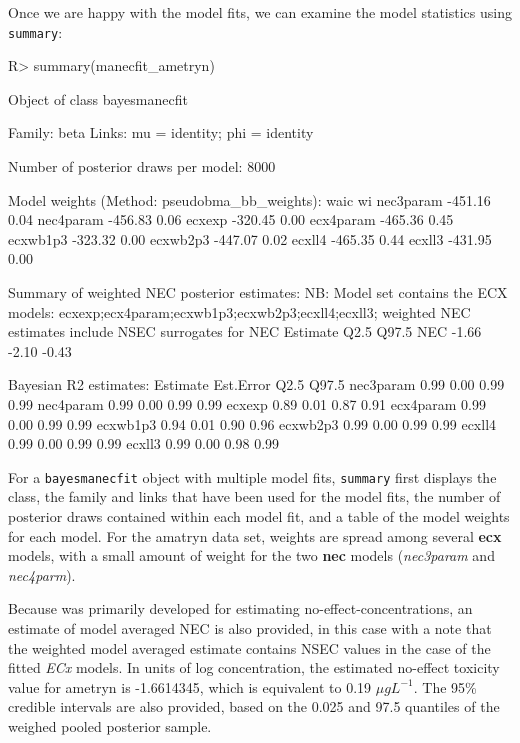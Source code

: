 \documentclass[
  shortnames]{jss}
\begin{document}
Once we are happy with the model fits, we can examine the model statistics using \texttt{summary}:

\begin{CodeChunk}
\begin{CodeInput}
R> summary(manecfit_ametryn)
\end{CodeInput}
\begin{CodeOutput}
Object of class bayesmanecfit

 Family: beta  
  Links: mu = identity; phi = identity  

Number of posterior draws per model:  8000

Model weights (Method: pseudobma_bb_weights):
             waic   wi
nec3param -451.16 0.04
nec4param -456.83 0.06
ecxexp    -320.45 0.00
ecx4param -465.36 0.45
ecxwb1p3  -323.32 0.00
ecxwb2p3  -447.07 0.02
ecxll4    -465.35 0.44
ecxll3    -431.95 0.00


Summary of weighted NEC posterior estimates:
NB: Model set contains the ECX models: ecxexp;ecx4param;ecxwb1p3;ecxwb2p3;ecxll4;ecxll3; weighted NEC estimates include NSEC surrogates for NEC
    Estimate  Q2.5 Q97.5
NEC    -1.66 -2.10 -0.43


Bayesian R2 estimates:
          Estimate Est.Error Q2.5 Q97.5
nec3param     0.99      0.00 0.99  0.99
nec4param     0.99      0.00 0.99  0.99
ecxexp        0.89      0.01 0.87  0.91
ecx4param     0.99      0.00 0.99  0.99
ecxwb1p3      0.94      0.01 0.90  0.96
ecxwb2p3      0.99      0.00 0.99  0.99
ecxll4        0.99      0.00 0.99  0.99
ecxll3        0.99      0.00 0.98  0.99
\end{CodeOutput}
\end{CodeChunk}

For a \texttt{bayesmanecfit} object with multiple model fits, \texttt{summary} first displays the class, the family and links that have been used for the model fits, the number of posterior draws contained within each model fit, and a table of the model weights for each model. For the amatryn data set, weights are spread among several \textbf{ecx} models, with a small amount of weight for the two \textbf{nec} models (\emph{nec3param} and \emph{nec4parm}).

Because  was primarily developed for estimating no-effect-concentrations, an estimate of model averaged NEC is also provided, in this case with a note that the weighted model averaged estimate contains NSEC values in the case of the fitted \emph{ECx} models. In units of log concentration, the estimated no-effect toxicity value for ametryn is -1.6614345, which is equivalent to 0.19 \({\mu}gL^{-1}\). The 95\% credible intervals are also provided, based on the 0.025 and 97.5 quantiles of the weighed pooled posterior sample.
\end{document}
